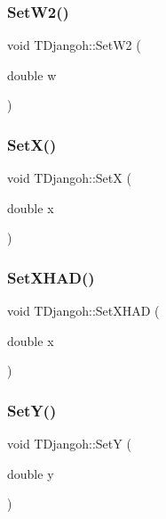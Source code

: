 \subsubsection{\texorpdfstring{Set\+W2()}{SetW2()}}
{\footnotesize\ttfamily void T\+Djangoh\+::\+Set\+W2 (\begin{DoxyParamCaption}\item[{double}]{w }\end{DoxyParamCaption})\hspace{0.3cm}{\ttfamily [inline]}}

\mbox{\label{class_t_djangoh_a1ef3828a15dfd67a5e5c902bd584fd8b}} 
\subsubsection{\texorpdfstring{Set\+X()}{SetX()}}
{\footnotesize\ttfamily void T\+Djangoh\+::\+SetX (\begin{DoxyParamCaption}\item[{double}]{x }\end{DoxyParamCaption})\hspace{0.3cm}{\ttfamily [inline]}}

\mbox{\label{class_t_djangoh_a13173ef3490a98d8488ce7421905284c}} 
\subsubsection{\texorpdfstring{Set\+X\+H\+A\+D()}{SetXHAD()}}
{\footnotesize\ttfamily void T\+Djangoh\+::\+Set\+X\+H\+AD (\begin{DoxyParamCaption}\item[{double}]{x }\end{DoxyParamCaption})\hspace{0.3cm}{\ttfamily [inline]}}

\mbox{\label{class_t_djangoh_a91061fe2a386a9ddb7c7398c9443fa74}} 
\subsubsection{\texorpdfstring{Set\+Y()}{SetY()}}
{\footnotesize\ttfamily void T\+Djangoh\+::\+SetY (\begin{DoxyParamCaption}\item[{double}]{y }\end{DoxyParamCaption})\hspace{0.3cm}{\ttfamily [inline]}}

